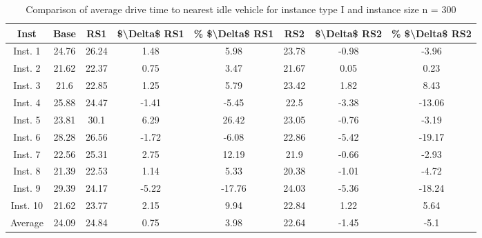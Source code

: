 \begin{table}[H]
\centering
\begin{tabular}{cccccccc}
  \hline
  \textbf{Inst} & \textbf{Base} & \textbf{RS1} & \textbf{\$\textbackslash{}Delta\$  RS1} & \textbf{\% \$\textbackslash{}Delta\$  RS1} & \textbf{RS2} & \textbf{\$\textbackslash{}Delta\$  RS2} & \textbf{\% \$\textbackslash{}Delta\$  RS2} \\\hline
  Inst. 1 & 24.76 & 26.24 & 1.48 & 5.98 & 23.78 & -0.98 & -3.96 \\
  Inst. 2 & 21.62 & 22.37 & 0.75 & 3.47 & 21.67 & 0.05 & 0.23 \\
  Inst. 3 & 21.6 & 22.85 & 1.25 & 5.79 & 23.42 & 1.82 & 8.43 \\
  Inst. 4 & 25.88 & 24.47 & -1.41 & -5.45 & 22.5 & -3.38 & -13.06 \\
  Inst. 5 & 23.81 & 30.1 & 6.29 & 26.42 & 23.05 & -0.76 & -3.19 \\
  Inst. 6 & 28.28 & 26.56 & -1.72 & -6.08 & 22.86 & -5.42 & -19.17 \\
  Inst. 7 & 22.56 & 25.31 & 2.75 & 12.19 & 21.9 & -0.66 & -2.93 \\
  Inst. 8 & 21.39 & 22.53 & 1.14 & 5.33 & 20.38 & -1.01 & -4.72 \\
  Inst. 9 & 29.39 & 24.17 & -5.22 & -17.76 & 24.03 & -5.36 & -18.24 \\
  Inst. 10 & 21.62 & 23.77 & 2.15 & 9.94 & 22.84 & 1.22 & 5.64 \\
  Average & 24.09 & 24.84 & 0.75 & 3.98 & 22.64 & -1.45 & -5.1 \\\hline
\end{tabular}
\caption{Comparison of average drive time to nearest idle vehicle for instance type I and instance size n = 300}
\label{tab:wait:resrelocation-nearest-drive-time-comparison_I_300}
\end{table}

